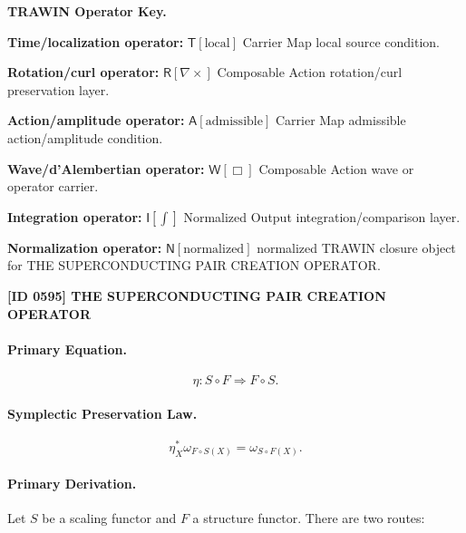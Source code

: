 \par\vspace{0.45\baselineskip}
\noindent\begin{minipage}[t]{\linewidth}
\begingroup
\small
\raggedright
\textbf{TRAWIN Operator Key.}\par
\noindent\textbf{Time/localization operator:} $\mathsf{T}\!\left[\mathrm{local}\right]$ Carrier Map local source condition.\par
\noindent\textbf{Rotation/curl operator:} $\mathsf{R}\!\left[\nabla\times\right]$ Composable Action rotation/curl preservation layer.\par
\noindent\textbf{Action/amplitude operator:} $\mathsf{A}\!\left[\mathrm{admissible}\right]$ Carrier Map admissible action/amplitude condition.\par
\noindent\textbf{Wave/d'Alembertian operator:} $\mathsf{W}\!\left[\Box\right]$ Composable Action wave or operator carrier.\par
\noindent\textbf{Integration operator:} $\mathsf{I}\!\left[\int\right]$ Normalized Output integration/comparison layer.\par
\noindent\textbf{Normalization operator:} $\mathsf{N}\!\left[\mathrm{normalized}\right]$ normalized TRAWIN closure object for THE SUPERCONDUCTING PAIR CREATION OPERATOR.\par
\endgroup
\end{minipage}

\clearpage
\noindent\textbf{[ID 0595] THE SUPERCONDUCTING PAIR CREATION OPERATOR}\par
\vspace{0.35em}
\paragraph{Primary Equation.}
\begin{equation}
\eta:S\circ F\Rightarrow F\circ S.
\end{equation}

\paragraph{Symplectic Preservation Law.}
\begin{equation}
\eta_X^{*}\omega_{F\circ S(X)}
=
\omega_{S\circ F(X)}.
\end{equation}

\paragraph{Primary Derivation.}
Let $S$ be a scaling functor and $F$ a structure functor.  
There are two routes:


